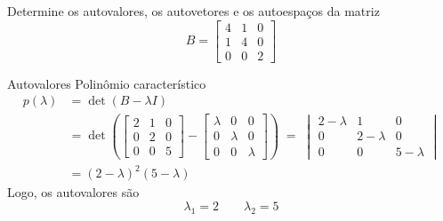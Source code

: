 \begin{question}
  Determine os autovalores, os autovetores e os autoespaços da matriz
  \[
    B =
    \begin{bmatrix}
      4 & 1 & 0 \\
      1 & 4 & 0 \\
      0 & 0 & 2
    \end{bmatrix}
  \]
\end{question}

\begin{resolution}{Autovalores}
  Polinômio característico
  \begin{align*}
    p(\lambda)
    & = \det(B-\lambda I) \\
    & = \det\left(
          \begin{bmatrix}
            2 & 1 & 0 \\
            0 & 2 & 0 \\
            0 & 0 & 5
          \end{bmatrix}
          -
          \begin{bmatrix}
            \lambda & 0       & 0       \\
            0       & \lambda & 0       \\
            0       & 0       & \lambda
          \end{bmatrix}
          \right)
    \;=\; \begin{vmatrix}
      2-\lambda & 1         & 0         \\
      0         & 2-\lambda & 0         \\
      0         & 0         & 5-\lambda
    \end{vmatrix}
    \\
    & = (2-\lambda)^2(5-\lambda)
  \end{align*}
  Logo, os autovalores são
  \[
    \lambda_{1} = 2
    \qquad
    \lambda_{2} = 5
  \]
\end{resolution}

